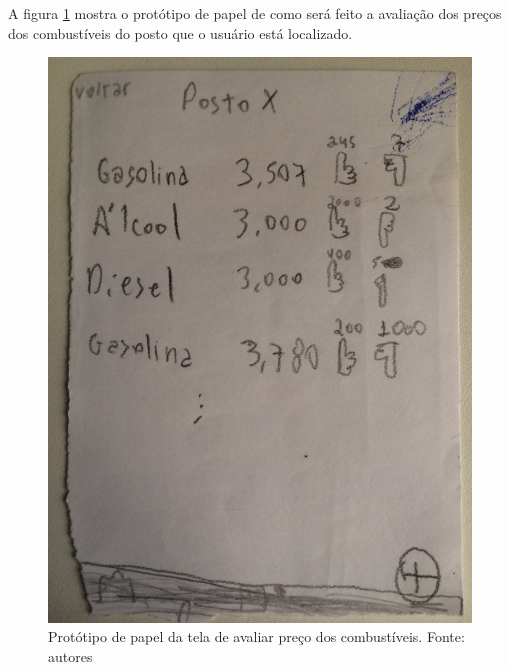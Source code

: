 A figura \ref{img:prototipo_de_papel_precos_combustiveis} mostra o protótipo de papel de como será feito a avaliação dos preços dos combustíveis do posto que o usuário está localizado.
\begin{figure}[H]
    \centering
    \includegraphics[scale=0.1, angle=-90]{figuras/prototipo_papel_avaliar_precos_postos.jpg}
    \caption[Protótipo de papel da tela de avaliar preço dos combustíveis]{Protótipo de papel da tela de avaliar preço dos combustíveis. Fonte: autores}
    \label{img:prototipo_de_papel_precos_combustiveis}
\end{figure}
 \pagebreak

